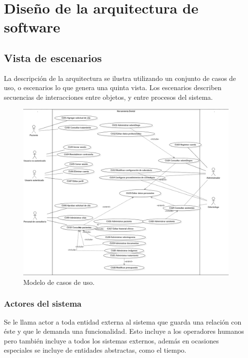 
\newpage
\section{Diseño de la arquitectura de software}

\subsection{Vista de escenarios}

La descripción de la arquitectura se ilustra utilizando un conjunto de casos de uso, o escenarios lo que genera una quinta vista. Los escenarios describen secuencias de interacciones entre objetos, y entre procesos del sistema.

\begin{figure}[H]
\centering
\includegraphics[width=18cm, keepaspectratio]{pictures/herramienta_dental.png}
\caption{Modelo de casos de uso.}
\end{figure}


\newpage
\subsubsection{Actores del sistema}

Se le llama actor a toda entidad externa al sistema que guarda una relación con éste y que le demanda una funcionalidad. Esto incluye a los operadores humanos pero también incluye a todos los sistemas externos, además en ocasiones especiales se incluye de entidades abstractas, como el tiempo.

